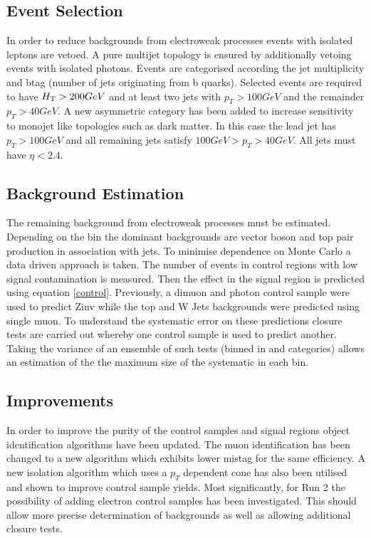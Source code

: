 \subsection{Event Selection}
In order to reduce backgrounds from electroweak processes events with isolated leptons are vetoed. 
A pure multijet topology is ensured by additionally vetoing events with isolated photons. 
Events are categorised according the jet multiplicity and btag (number of jets originating from b quarks). 
Selected events are required to have $\mbox{$H_\text{T}$} > 200 GeV$ and at least two jets with $p_T > 100GeV$ and the
 remainder $p_T > 40GeV$. A new asymmetric category has
 been added to increase sensitivity to monojet like
  topologies such as dark matter. 
  In this case the lead jet has $p_T > 100 GeV$ and all remaining jets satisfy $100 GeV > p_T > 40GeV$. 
  All jets must have $\eta < 2.4$.

\subsection{Background Estimation}
\label{sec:bkgd-est}
The remaining background from electroweak processes must be estimated. 
Depending on the bin the dominant backgrounds are vector boson 
and top pair production in association with jets. To minimise 
dependence on Monte Carlo a data driven approach is taken. 
The number of events in control regions with low signal contamination 
is measured. Then the effect in the signal region is predicted using 
equation \ref{control}. Previously, a dimuon and photon control sample 
were used to predict Zinv while the top and W Jets backgrounds were predicted 
using single muon. To understand the systematic error on these predictions 
closure tests are carried out whereby one control sample is used to predict another. 
Taking the variance of an ensemble of such tests (binned in \scalht and categories) allows an estimation 
of the the maximum size of the systematic in each bin.

\subsection{Improvements}

In order to improve the purity of the control samples and signal regions
object identification algorithms have been updated. The muon identification
has been changed to a new algorithm which exhibits lower mistag for the same
efficiency. A new isolation algorithm which uses a $p_T$ dependent cone
has also been utilised and shown to improve control sample yields. 
Most significantly, for Run 2 the possibility of adding electron control 
samples has been investigated. This should allow more precise determination 
of backgrounds as well as allowing additional closure tests.

